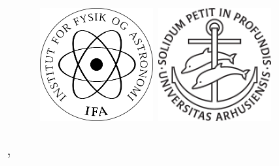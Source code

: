 \documentclass[../main.tex]{subfiles} %
\begin{document}
\begin{titlepage}
    \begin{figure}[ht!] %
        \begin{center}
            \includegraphics[height=3cm]{beforeText/frontpageImages/IFALogo.png}
            \hspace{1em}
            \includegraphics[height=3cm]{beforeText/frontpageImages/auseglSort.eps}
        \end{center}
    \end{figure} %
    
    \Department\par
    \Faculty\par
    \University\par
    \Month\ \Date, \Year
    
\end{titlepage} %

\restoregeometry %
\end{document}
